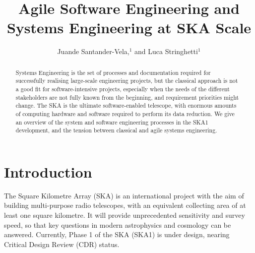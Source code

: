 \documentclass[11pt,twoside]{article}
\begin{document}
\title{Agile Software Engineering and Systems Engineering at SKA Scale}

\author{Juande Santander-Vela,$^1$ and Luca Stringhetti$^1$
}


\begin{abstract}
Systems Engineering is the set of processes and documentation required for successfully realising large-scale engineering projects, but the classical approach is not a good fit for software-intensive projects, especially when the needs of the different stakeholders are not fully known from the beginning, and requirement priorities might change. The SKA is the ultimate software-enabled telescope, with enormous amounts of computing hardware and software required to perform its data reduction. We give an overview of the system and software engineering processes in the SKA1 development, and the tension between classical and agile systems engineering.
\end{abstract}


\section{Introduction} %
\label{sec:introduction}
The Square Kilometre Array (SKA) is an international project with the aim of building multi-purpose radio telescopes, with an equivalent collecting area of at least one square kilometre. It will provide unprecedented sensitivity and survey speed, so that key questions in modern astrophysics and cosmology can be answered. Currently, Phase 1 of the SKA (SKA1) is under design, nearing Critical Design Review (CDR) status.	
	
\end{document}
